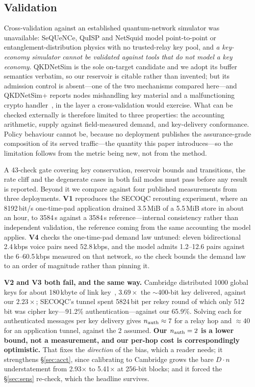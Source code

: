 \documentclass[conference]{IEEEtran}
\begin{document}
\subsection{Validation}\label{sec:valid}
Cross-validation against an established quantum-network simulator was unavailable:
SeQUeNCe, QuISP and NetSquid model point-to-point or entanglement-distribution physics
with no trusted-relay key pool, and \emph{a key-economy simulator cannot be validated
against tools that do not model a key economy}. QKDNetSim is the sole on-target
candidate and we adopt its buffer semantics verbatim, so our reservoir is citable
rather than invented; but its admission control is absent---one of the two mechanisms
compared here---and QKDNetSim+ reports nodes mishandling key material and a
malfunctioning crypto handler~\cite{qkdnetsimplus}, in the layer a cross-validation
would exercise. What can be checked externally is therefore
limited to three properties: the accounting arithmetic, supply against
field-measured demand, and key-delivery conformance. Policy behaviour cannot be,
because no deployment publishes the assurance-grade composition of its served
traffic---the quantity this paper introduces---so the limitation follows from the
metric being new, not from the method.

A 43-check gate covering key conservation, reservoir bounds and transitions, the rate
cliff and the degenerate cases in both fail modes must pass before any result is
reported. Beyond it we compare against four published measurements from three
deployments. \textbf{V1} reproduces the SECOQC rerouting experiment, where an
8192\,bit/s one-time-pad application drained 3.5\,MiB of a 5.5\,MiB store in about an
hour, to 3584\,s against a 3584\,s reference---internal consistency rather than
independent validation, the reference coming from the same accounting the model
applies. \textbf{V4} checks the one-time-pad demand law untuned: eleven bidirectional
2.4\,kbps voice pairs need 52.8\,kbps, and the model admits 1.2--12.6 pairs against
the 6--60.5\,kbps measured on that network, so the check bounds the demand law to an
order of magnitude rather than pinning it.

\textbf{V2 and V3 both fail, and the same way.} Cambridge distributed 1000 global
keys for about 180\,kbyte of link key~\cite{dynes}, $3.69\times$ the $\sim$400-bit
key delivered, against our $2.23\times$; SECOQC's tunnel spent 5824\,bit per rekey round of which
only 512\,bit was cipher key---91.2\% authentication---against our 65.9\%. Solving
each for authenticated messages per key delivery gives $n_{\rm auth}\approx7$ for a
relay hop and $\approx40$ for an application tunnel, against the 2 assumed. \textbf{Our $n_{\rm auth}=2$ is
a lower bound, not a measurement, and our per-hop cost is correspondingly
optimistic.} That fixes the \emph{direction} of the bias, which a reader needs; it
strengthens \S\ref{sec:acct}, since calibrating to Cambridge grows the bare
$D{\cdot}n$ understatement from 2.93$\times$ to 5.41$\times$ at 256-bit blocks; and
it forced the \S\ref{sec:sens} re-check, which the headline survives.
\end{document}
